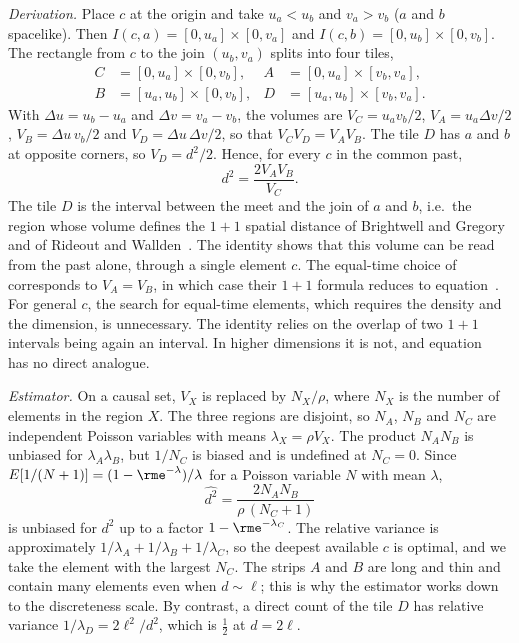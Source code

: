 \documentclass[12pt]{iopart}
\begin{document}
\emph{Derivation.} Place $c$ at the origin and take $u_a<u_b$ and $v_a>v_b$ ($a$ and $b$ spacelike). Then $I(c,a)=[0,u_a]\times[0,v_a]$ and $I(c,b)=[0,u_b]\times[0,v_b]$. The rectangle from $c$ to the join $(u_b,v_a)$ splits into four tiles,
\begin{equation}
\begin{aligned}
C&=[0,u_a]\times[0,v_b], & A&=[0,u_a]\times[v_b,v_a],\\
B&=[u_a,u_b]\times[0,v_b], & D&=[u_a,u_b]\times[v_b,v_a].
\end{aligned}
\end{equation}
With $\Delta u=u_b-u_a$ and $\Delta v=v_a-v_b$, the volumes are $V_C=u_av_b/2$, $V_A=u_a\Delta v/2$, $V_B=\Delta u\,v_b/2$ and $V_D=\Delta u\,\Delta v/2$, so that $V_CV_D=V_AV_B$. The tile $D$ has $a$ and $b$ at opposite corners, so $V_D=d^2/2$. Hence, for every $c$ in the common past,
\begin{equation}
d^2=\frac{2V_AV_B}{V_C}.
\label{eq:rect}
\end{equation}
The tile $D$ is the interval between the meet and the join of $a$ and $b$, i.e.\ the region whose volume defines the $1+1$ spatial distance of Brightwell and Gregory and of Rideout and Wallden~\cite{BrightwellGregory91,RideoutWallden09}. The identity shows that this volume can be read from the past alone, through a single element $c$. The equal-time choice of~\cite{BK24} corresponds to $V_A=V_B$, in which case their $1+1$ formula reduces to equation~. For general $c$, the search for equal-time elements, which requires the density and the dimension, is unnecessary. The identity relies on the overlap of two $1+1$ intervals being again an interval. In higher dimensions it is not, and equation~ has no direct analogue.

\emph{Estimator.} On a causal set, $V_X$ is replaced by $N_X/\rho$, where $N_X$ is the number of elements in the region $X$. The three regions are disjoint, so $N_A$, $N_B$ and $N_C$ are independent Poisson variables with means $\lambda_X=\rho V_X$. The product $N_AN_B$ is unbiased for $\lambda_A\lambda_B$, but $1/N_C$ is biased and is undefined at $N_C=0$. Since $E[1/(N+1)]=(1-\rme^{-\lambda})/\lambda$ for a Poisson variable $N$ with mean $\lambda$,
\begin{equation}
\widehat{d^2}=\frac{2N_AN_B}{\rho\,(N_C+1)}
\label{eq:est}
\end{equation}
is unbiased for $d^2$ up to a factor $1-\rme^{-\lambda_C}$. The relative variance is approximately $1/\lambda_A+1/\lambda_B+1/\lambda_C$, so the deepest available $c$ is optimal, and we take the element with the largest $N_C$. The strips $A$ and $B$ are long and thin and contain many elements even when $d\sim\ell$; this is why the estimator works down to the discreteness scale. By contrast, a direct count of the tile $D$ has relative variance $1/\lambda_D=2\ell^2/d^2$, which is $\tfrac12$ at $d=2\ell$.
\end{document}
